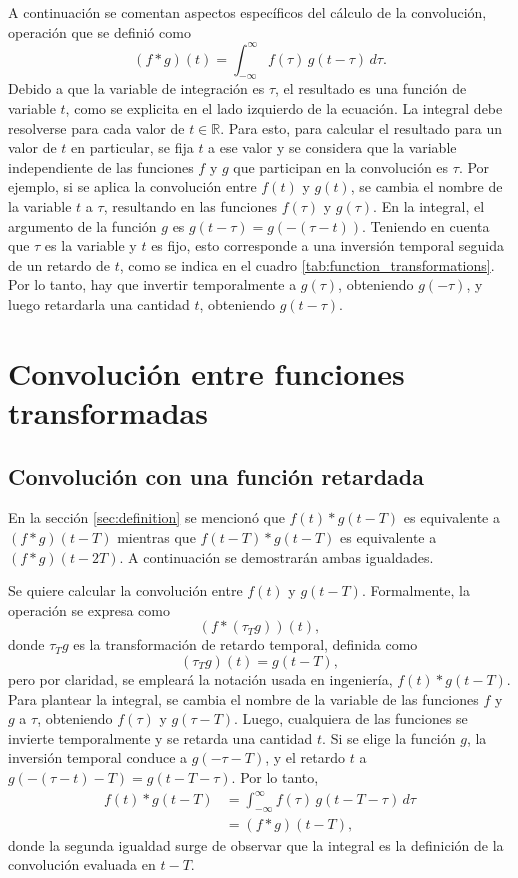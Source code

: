 \documentclass[a4paper]{article}
\begin{document}
A continuación se comentan aspectos específicos del cálculo de la convolución, operación que se definió como
\[
 (f*g)(t)=\int _{-\infty }^{\infty }f(\tau )\,g(t-\tau )\,d\tau.
\]
Debido a que la variable de integración es \(\tau\), el resultado es una función de variable \(t\), como se explicita en el lado izquierdo de la ecuación. La integral debe resolverse para cada valor de \(t\in\mathbb{R}\). Para esto, para calcular el resultado para un valor de \(t\) en particular, se fija \(t\) a ese valor y se considera que la variable independiente de las funciones \(f\) y \(g\) que participan en la convolución es \(\tau\). Por ejemplo, si se aplica la convolución entre \(f(t)\) y \(g(t)\), se cambia el nombre de la variable \(t\) a \(\tau\), resultando en las funciones \(f(\tau)\) y \(g(\tau)\). En la integral, el argumento de la función \(g\) es \(g(t-\tau)=g(-(\tau-t))\). Teniendo en cuenta que \(\tau\) es la variable y \(t\) es fijo, esto corresponde a una inversión temporal seguida de un retardo de \(t\), como se indica en el cuadro \ref{tab:function_transformations}. Por lo tanto, hay que invertir temporalmente a \(g(\tau)\), obteniendo \(g(-\tau)\), y luego retardarla una cantidad \(t\), obteniendo \(g(t-\tau)\).

\section{Convolución entre funciones transformadas}

\subsection{Convolución con una función retardada}

En la sección \ref{sec:definition} se mencionó que \(f(t)*g(t-T)\) es equivalente a \((f*g)(t-T)\) mientras que \(f(t-T)*g(t-T)\) es equivalente a \((f*g)(t-2T)\). A continuación se demostrarán ambas igualdades.

Se quiere calcular la convolución entre \(f(t)\) y \(g(t-T)\). Formalmente, la operación se expresa como
\[
 \left({f}*(\tau_{T}g)\right)(t),
\]
donde \(\tau_Tg\) es la transformación de retardo temporal, definida como
\[
 (\tau_{T}g)(t)=g(t-T),
\]
pero por claridad, se empleará la notación usada en ingeniería, \(f(t)*g(t-T)\). Para plantear la integral, se cambia el nombre de la variable de las funciones \(f\) y \(g\) a \(\tau\), obteniendo \(f(\tau)\) y \(g(\tau-T)\). Luego, cualquiera de las funciones se invierte temporalmente y se retarda una cantidad \(t\). Si se elige la función \(g\), la inversión temporal conduce a \(g(-\tau-T)\), y el retardo \(t\) a \(g(-(\tau-t)-T)=g(t-T-\tau)\). Por lo tanto,
\begin{align*}
 f(t)*g(t-T)&=\int _{-\infty }^{\infty }f(\tau)\,g(t-T-\tau)\,d\tau \\
   &=(f*g)(t-T),
\end{align*}
donde la segunda igualdad surge de observar que la integral es la definición de la convolución evaluada en \(t-T\).
\end{document}
